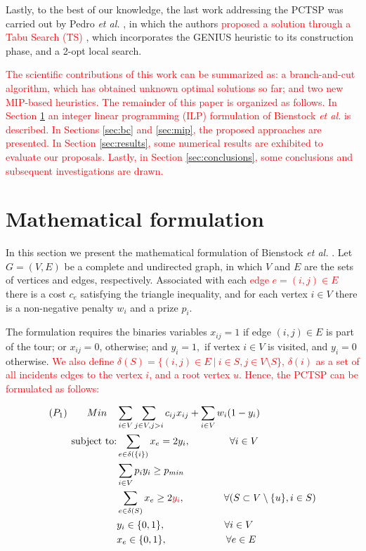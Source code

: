 \documentclass{ro}
\begin{document}
Lastly, to the best of our knowledge, the last work addressing the PCTSP was carried out by Pedro \textit{et al.} \cite{pedro2013tabu}, in which the authors \textcolor{red}{proposed a solution through a Tabu Search (TS) \cite{laguna2018tabu}}, which incorporates the GENIUS \cite{genius} heuristic to its construction phase, and a 2-opt local search.

\textcolor{red}{
The  scientific contributions of this work can be summarized as: a branch-and-cut algorithm, which has obtained unknown optimal solutions so far; and two new MIP-based heuristics. The remainder of this paper is organized as follows. In Section \ref{sec:mf} an integer linear programming (ILP) formulation of Bienstock \textit{et al.}\cite{bienstock1993note} is described. In Sections \ref{sec:bc} and \ref{sec:mip}, the proposed approaches are presented. In Section \ref{sec:results}, some numerical results are exhibited to evaluate our proposals. Lastly, in Section \ref{sec:conclusions}, some conclusions and subsequent investigations are drawn.
}

\section{Mathematical formulation}
\label{sec:mf}




In this section we present the mathematical formulation of Bienstock \textit{et al.} \cite{bienstock1993note}. 
Let $G = (V, E)$ be a complete and undirected graph, in which $V$ and $E$ are the sets of vertices and edges, respectively. Associated with each \textcolor{red}{edge $e = (i, j) \in E$} there is a cost $c_e$ satisfying the triangle inequality, and for each vertex $i \in V$ there is a non-negative penalty $w_i$ and a prize $p_i$.

 The formulation requires the binaries variables $x_{ij}=1$ if edge $(i, j) \in E $
is part of the tour; or $x_{ij}=0$, otherwise; and  $y_i =  1,$ if vertex  $i \in V$ is visited, and $y_i=0$  otherwise. \textcolor{red}{We also define $\delta(S) = \{ (i,j) \in E \ | \ i \in S, j \in V \setminus S \}$, $\delta(i)$ as a set of all incidents edges to the vertex $i$, and a root vertex $u$. Hence, the PCTSP can be formulated as follows:}

	\begin{align}
(P_1) \qquad	Min \quad  &\sum_{i \in V} \sum_{j \in V, j > i} c_{ij}x_{ij} + \sum_{i \in V} w_i (1 - y_i)  \label{naodir1}\\
	\text{subject to:}
	&\sum_{e \in \delta(\{i\})} x_e = 2 y_i,  \qquad \qquad \forall i \in V\label{naodir2}\\
	&\sum_{i \in V}p_iy_i \geq p_{min} \label{naodir3}\\
	&\sum_{e \in \delta(S)} x_e \geq 2 \textcolor{red}{y_i}, \qquad  \qquad \forall (S \subset V \setminus \{u\}, i \in S) \label{naodir4}\\
	&y_i \in \{0,1\}, \qquad \qquad \qquad \forall i \in V \label{naodir5}\\
	&x_e \in \{0,1\}, \qquad \qquad \qquad \forall e \in E \label{naodir6} 
	\end{align}
\end{document}
